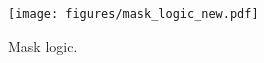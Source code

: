 
\begin{figure}[t!]
\centering
\texttt{[image: figures/mask\_logic\_new.pdf]}
\caption{Mask logic.}
\label{fig:mask_logic}
\end{figure}


